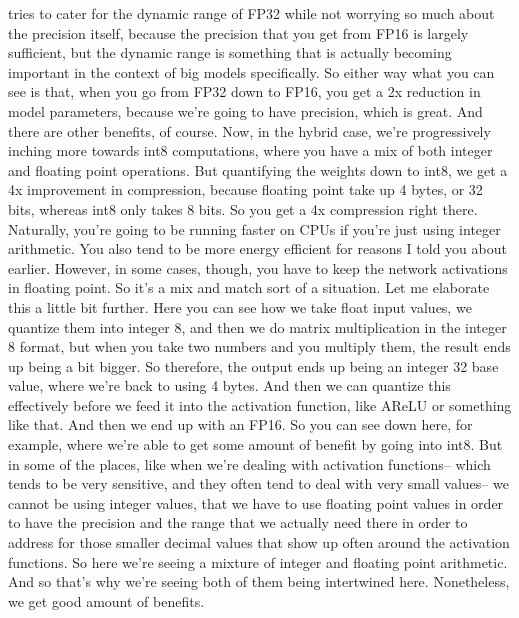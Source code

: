 {{{{{    tries to cater for the dynamic range of FP32
    while not worrying so much about the precision itself,
    because the precision that you get from FP16 is largely sufficient,
    but the dynamic range is something that is actually becoming
    important in the context of big models specifically.
    So either way what you can see is that, when you go from FP32 down to FP16,
    you get a 2x reduction in model parameters,
    because we're going to have precision, which is great.
    And there are other benefits, of course.
    Now, in the hybrid case, we're progressively
    inching more towards int8 computations, where
    you have a mix of both integer and floating point operations.
    But quantifying the weights down to int8,
    we get a 4x improvement in compression, because floating point
    take up 4 bytes, or 32 bits, whereas int8 only takes 8 bits.
    So you get a 4x compression right there.
    Naturally, you're going to be running faster on CPUs if you're just
    using integer arithmetic.
    You also tend to be more energy efficient for reasons
    I told you about earlier.
    However, in some cases, though, you have to keep the network activations
    in floating point.
    So it's a mix and match sort of a situation.
    Let me elaborate this a little bit further.
    Here you can see how we take float input values,
    we quantize them into integer 8, and then
    we do matrix multiplication in the integer 8 format,
    but when you take two numbers and you multiply them,
    the result ends up being a bit bigger.
    So therefore, the output ends up being an integer 32 base value,
    where we're back to using 4 bytes.
    And then we can quantize this effectively
    before we feed it into the activation function,
    like AReLU or something like that.
    And then we end up with an FP16.
    So you can see down here, for example, where
    we're able to get some amount of benefit by going into int8.
    But in some of the places, like when we're dealing with activation
    functions-- which tends to be very sensitive,
    and they often tend to deal with very small values--
    we cannot be using integer values, that we have to use floating point values
    in order to have the precision and the range that we actually need there
    in order to address for those smaller decimal values that show up often
    around the activation functions.
    So here we're seeing a mixture of integer and floating point arithmetic.
    And so that's why we're seeing both of them being intertwined here.
    Nonetheless, we get good amount of benefits.
}}}}}
